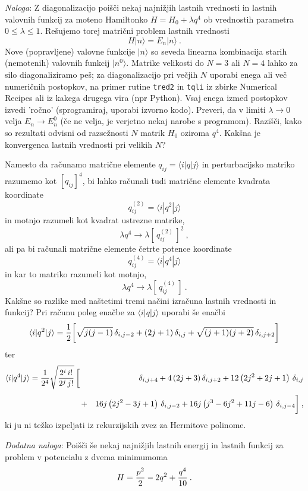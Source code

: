 \documentclass[slovene,11pt,a4paper]{article}
\begin{document}
{\sl Naloga\/}: Z diagonalizacijo poišči nekaj najnižjih lastnih
vrednosti in lastnih valovnih funkcij za moteno Hamiltonko
$H = H_0 + \lambda q^4$
ob vrednostih parametra $0\le\lambda\le 1$.  Rešujemo torej
matrični problem lastnih vrednosti
\begin{equation*}
  H | n \rangle = E_n | n \rangle \>.
\end{equation*}
Nove (popravljene) valovne funkcije $| n\rangle$ so seveda
linearna kombinacija starih (nemotenih) valovnih funkcij $| n^0\rangle$.
Matrike velikosti do $N=3$ ali $N=4$ lahko za silo diagonaliziramo peš;
za diagonalizacijo pri večjih $N$ uporabi enega ali več numeričnih postopkov,
na primer rutine {\tt tred2} in {\tt tqli}
iz zbirke Numerical Recipes ali iz kakega drugega vira (npr Python). Vsaj enega izmed
postopkov izvedi 'ročno' (sprogramiraj, uporabi izvorno kodo).  Preveri,
da v limiti $\lambda\to 0$ velja $E_n\to E_n^0$
(če ne velja, je verjetno nekaj narobe s programom).
Razišči, kako so rezultati odvisni od razsežnosti $N$ matrik
$H_0$ oziroma $q^4$.  Kakšna je konvergenca lastnih vrednosti
pri velikih $N$?

\bigskip

Namesto da računamo matrične elemente
$q_{ij}=\langle i | q | j \rangle$ in perturbacijsko matriko
razumemo kot $[ q_{ij} ]^4$, bi lahko računali tudi matrične
elemente kvadrata koordinate
\begin{equation*}
q^{(2)}_{ij} = \langle i | q^2 | j \rangle
\end{equation*}
in motnjo razumeli kot kvadrat ustrezne matrike,
\begin{equation*}
\lambda q^4 \to \lambda \left[ \, q^{(2)}_{ij} \,\right]^2 \>,
\end{equation*}
ali pa bi računali matrične elemente četrte potence koordinate
\begin{equation*}
q^{(4)}_{ij} = \langle i | q^4 | j \rangle
\end{equation*}
in kar to matriko razumeli kot motnjo,
\begin{equation*}
\lambda q^4 \to \lambda \left[ \, q^{(4)}_{ij} \,\right] \>.
\end{equation*}
Kakšne so razlike med naštetimi tremi načini izračuna
lastnih vrednosti in funkcij?  Pri računu poleg enačbe za $\langle i | q | j \rangle$ uporabi še enačbi
\begin{equation*}
\langle i|q^2|j\rangle
  = {1\over 2} \biggl[
    {\sqrt{j(j-1)}} \, \delta_{i,j-2}
  + {(2j+1)} \, \delta_{i,j}
  + {\sqrt{(j+1)(j+2)}} \, \delta_{i,j+2} \biggr]
\end{equation*}
ter
\begin{eqnarray*}
\langle i|q^4|j\rangle
  = {1\over 2^4}\sqrt{2^i \, i!\over 2^{j} \, j! } \, \biggl[ \,
  &\,& \delta_{i,j+4} + 4\left(2j+3\right) \delta_{i,j+2}
                      + 12 \left(2j^2+2j+1\right) \, \delta_{i,j} \\[3pt]
  &+& 16j \left(2j^2-3j+1\right) \, \delta_{i,j-2}
     + 16j\left(j^3-6j^2+11j-6\right) \, \delta_{i,j-4} \biggr] \>,
\end{eqnarray*}
ki ju ni težko izpeljati iz rekurzijskih zvez za Hermitove
polinome.

\bigskip

{\sl Dodatna naloga\/}: Poišči še nekaj najnižjih lastnih energij
in lastnih funkcij za problem v potencialu z dvema minimumoma
\begin{equation*}
H = {p^2\over 2} - 2q^2 + {q^4\over 10} \>.
\end{equation*}
\end{document}
